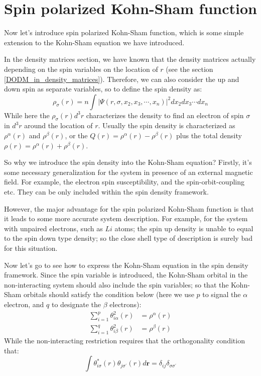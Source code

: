 \section{Spin polarized Kohn-Sham function}
%
%
%
%
Now let's introduce spin polarized Kohn-Sham function, which is some
simple extension to the Kohn-Sham equation we have introduced.

In the density matrices section, we have known that the density
matrices actually depending on the spin variables on the location of
$r$ (see the section \ref{DODM_in_density_matrices}). Therefore, we
can also consider the up and down spin as separate variables, so to
define the spin density as:
\begin{equation}
\label{eq:FIDFTeq:76} \rho_{\sigma}(r) = n \int |\Psi(r, \sigma,
x_{2}, x_{3}, \cdots, x_{n})|^{2} dx_{2}dx_{3}\cdots dx_{n}
\end{equation}
While here the $\rho_{\sigma}(r)d^{3}r$ characterizes the density to
find an electron of spin $\sigma$ in $d^{3}r$ around the location of
$r$. Usually the spin density is characterized as $\rho^{\alpha}(r)$
and $\rho^{\beta}(r)$, or the $Q(r) = \rho^{\alpha}(r) -
\rho^{\beta}(r)$ plus the total density $\rho(r) = \rho^{\alpha}(r)
+ \rho^{\beta}(r)$.

So why we introduce the spin density into the Kohn-Sham equation?
Firstly, it's some necessary generalization for the system in
presence of an external magnetic field. For example, the electron
spin susceptibility, and the spin-orbit-coupling etc. They can be
only included within the spin density framework.

However, the major advantage for the spin polarized Kohn-Sham
function is that it leads to some more accurate system description.
For example, for the system with unpaired electrons, such as $Li$
atoms; the spin up density is unable to equal to the spin down type
density; so the close shell type of description is surely bad for
this situation.

Now let's go to see how to express the Kohn-Sham equation in the
spin density framework. Since the spin variable is introduced, the
Kohn-Sham orbital in the non-interacting system should also include
the spin variables; so that the Kohn-Sham orbitals should satisfy
the condition below (here we use $p$ to signal the $\alpha$
electron, and $q$ to designate the $\beta$ electrons):
\begin{align}
  \label{DFTIeq:77}
    \sum_{i=1}^{p}\theta^{2}_{i\alpha}(r) &=
    \rho^{\alpha}(r) \nonumber \\
    \sum_{i=1}^{q}\theta^{2}_{i\beta}(r) &=
    \rho^{\beta}(r)
\end{align}
While the non-interacting restriction requires that the
orthogonality condition that:
\begin{equation}
  \label{DFTIeq:78}
\int \theta^{*}_{i\sigma}(r)\theta_{j\sigma^{'}}(r) d\bm{r} =
\delta_{ij}\delta_{\sigma\sigma^{'}}
\end{equation}

